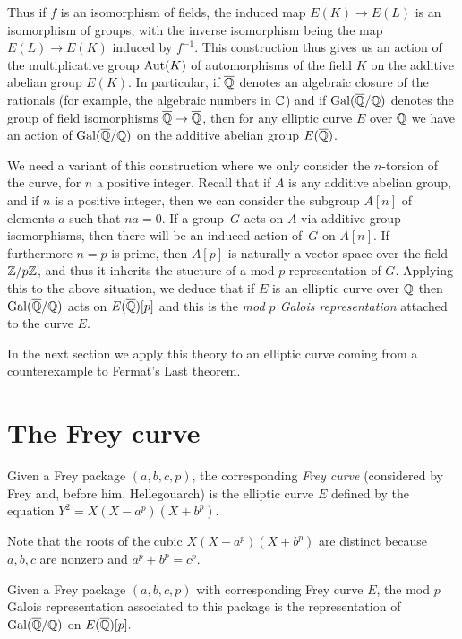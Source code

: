  Thus if $f$ is an isomorphism of fields, the induced map $E(K)\to E(L)$ is an isomorphism of groups, with the inverse isomorphism being the map $E(L)\to E(K)$ induced by $f^{-1}$. This construction thus gives us an action of the multiplicative group $\operatorname{Aut}(K)$ of automorphisms of the field $K$ on the additive abelian group $E(K)$. In particular, if $\overline{\mathbb{Q}}$ denotes an algebraic closure of the rationals (for example, the algebraic numbers in $\mathbb{C}$) and if $\operatorname{Gal}(\overline{\mathbb{Q}}/\mathbb{Q})$ denotes the group of field isomorphisms $\overline{\mathbb{Q}}\to\overline{\mathbb{Q}}$, then for any elliptic curve $E$ over $\mathbb{Q}$ we have an action of $\operatorname{Gal}(\overline{\mathbb{Q}}/\mathbb{Q})$ on the additive abelian group $E(\overline{\mathbb{Q}})$.

We need a variant of this construction where we only consider the $n$-torsion of the curve, for $n$ a positive integer. Recall that if $A$ is any additive abelian group, and if $n$ is a positive integer, then we can consider the subgroup $A[n]$ of elements $a$ such that $na=0$. If a group~$G$ acts on $A$ via additive group isomorphisms, then there will be an induced action of~$G$ on $A[n]$. If furthermore $n=p$ is prime, then $A[p]$ is naturally a vector space over the field $\mathbb{Z}/p\mathbb{Z}$, and thus it inherits the stucture of a mod $p$ representation of $G$. Applying this to the above situation, we deduce that if $E$ is an elliptic curve over $\mathbb{Q}$ then $\operatorname{Gal}(\overline{\mathbb{Q}}/\mathbb{Q})$ acts on $E(\overline{\mathbb{Q}})[p]$ and this is the \emph{mod $p$ Galois representation} attached to the curve $E$.

In the next section we apply this theory to an elliptic curve coming from a counterexample to Fermat's Last theorem.

\section{The Frey curve}

\begin{definition}[Frey]\label{FLT.Frey_curve}
  Given a Frey package $(a,b,c,p)$, the corresponding \emph{Frey curve} (considered by Frey and, before him, Hellegouarch) is the elliptic curve $E$ defined by the equation $Y^2=X(X-a^p)(X+b^p).$\end{definition}

Note that the roots of the cubic $X(X-a^p)(X+b^p)$ are distinct because $a,b,c$ are nonzero and $a^p+b^p=c^p$.

\begin{definition}\label{FLT.FreyCurve.mod_p_Galois_representation} Given a Frey package $(a,b,c,p)$ with corresponding Frey curve $E$, the mod $p$ Galois representation associated to this package is the representation of $\operatorname{Gal}(\overline{\mathbb{Q}}/\mathbb{Q})$ on $E(\overline{\mathbb{Q}})[p].$\end{definition}

